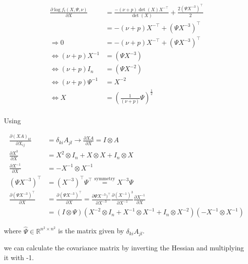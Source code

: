 \begin{align*}
	\frac{\partial \log f_t(X, \Psi, \nu)}{\partial X} &= \frac{-(\nu + p )\det(X) X^{-\top}}{\det(X)} + \frac{2(\Psi X^{-3})^\top}{2} \\
	&= -(\nu + p)X^{-\top} + (\Psi X^{-3})^\top \\
	\Rightarrow 0 &= -(\nu + p)X^{-\top} + (\Psi X^{-3})^\top \\
	\Leftrightarrow (\nu + p)X^{-1} &= (\Psi X^{-3}) \\
	\Leftrightarrow (\nu + p)I_n &= (\Psi X^{-2}) \\
	\Leftrightarrow (\nu + p)\Psi^{-1} &= X^{-2} \\
	\Leftrightarrow X &= \left(\frac{1}{(\nu + p)}\Psi\right)^{\frac{1}{2}} \\
\end{align*}

Using

\begin{align*}
	\frac{\partial (XA)_{kl}}{\partial X_{ij}} &= \delta_{ki}A_{jl} \rightarrow \frac{\partial XA}{\partial X} = I \otimes A\\
	\frac{\partial X^3}{\partial X} &= X^2 \otimes I_{n} + X \otimes X + I_{n} \otimes X \\
	\frac{\partial X^{-1}}{\partial X} &= - X^{-1} \otimes X^{-1} \\
	(\Psi X^{-3})^\top &= (X^{-3})^\top \Psi^\top \overset{\text{symmetry}}{=} X^{-3} \Psi \\
	\frac{\partial (\Psi X^{-3})^\top}{\partial X} &= \frac{\partial (\Psi X^{-3})^\top}{\partial X} = \frac{\partial \Psi X^{-3})^\top}{\partial X^{-3}} \frac{\partial (X^{-1})^3}{\partial X^{-1}} \frac{\partial X^{-1}}{\partial X} \\
	&= (I\otimes \Psi) (X^{-2} \otimes I_n + X^{-1} \otimes X^{-1} + I_n \otimes X^{-2}) (-X^{-1} \otimes X^{-1})
\end{align*}

where $\hat{\Psi} \in \mathbb{R}^{n^2 \times n^2}$ is the matrix given by $\delta_{ki}A_{jl}$.

we can calculate the covariance matrix by inverting the Hessian and multiplying it with -1.

